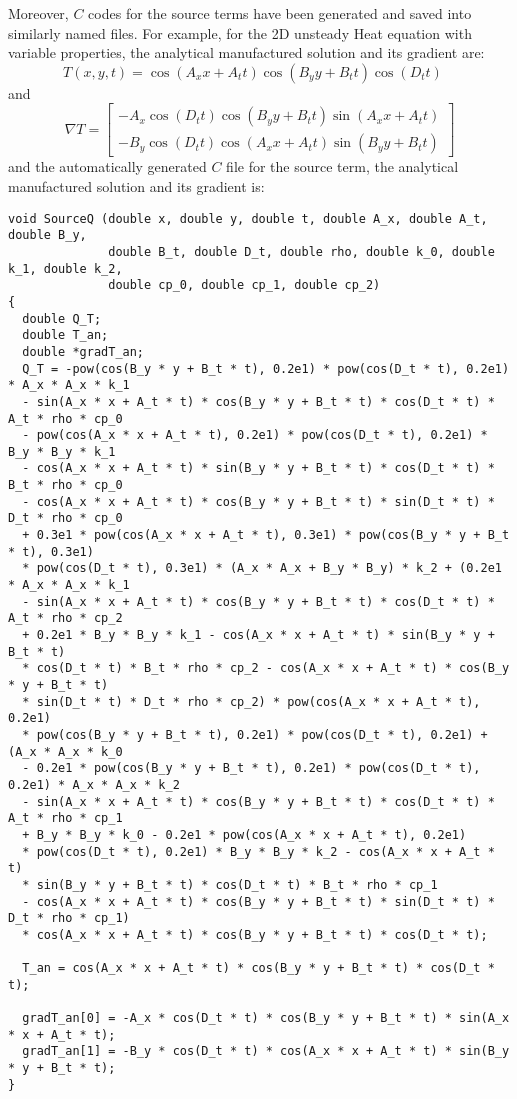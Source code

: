 \documentclass[a4paper,10pt]{article}
\begin{document}
Moreover, $C$ codes for the source terms have  been generated and saved into similarly named files. For example, for the 2D unsteady Heat equation with variable properties, the analytical manufactured solution and its gradient are:
\begin{equation}
 T(x,y,t) = \cos(A_x x+A_t t) \cos(B_y y+B_t t) \cos(D_t t)
\quad
\end{equation}
and
\begin{equation}
\nabla T = \left[
\begin{array}{c}
-A_x \cos(D_t t) \cos(B_y y+B_t t) \sin(A_x x+A_t t)\\
-B_y \cos(D_t t) \cos(A_x x+A_t t) \sin(B_y y+B_t t)
\end{array}\right]
\end{equation}
and the automatically generated $C$ file for the source term, the analytical manufactured solution and its gradient  is:
\begin{verbatim}
void SourceQ (double x, double y, double t, double A_x, double A_t, double B_y,
              double B_t, double D_t, double rho, double k_0, double k_1, double k_2,
              double cp_0, double cp_1, double cp_2)
{
  double Q_T;
  double T_an;
  double *gradT_an;
  Q_T = -pow(cos(B_y * y + B_t * t), 0.2e1) * pow(cos(D_t * t), 0.2e1) * A_x * A_x * k_1
  - sin(A_x * x + A_t * t) * cos(B_y * y + B_t * t) * cos(D_t * t) * A_t * rho * cp_0
  - pow(cos(A_x * x + A_t * t), 0.2e1) * pow(cos(D_t * t), 0.2e1) * B_y * B_y * k_1
  - cos(A_x * x + A_t * t) * sin(B_y * y + B_t * t) * cos(D_t * t) * B_t * rho * cp_0
  - cos(A_x * x + A_t * t) * cos(B_y * y + B_t * t) * sin(D_t * t) * D_t * rho * cp_0
  + 0.3e1 * pow(cos(A_x * x + A_t * t), 0.3e1) * pow(cos(B_y * y + B_t * t), 0.3e1)
  * pow(cos(D_t * t), 0.3e1) * (A_x * A_x + B_y * B_y) * k_2 + (0.2e1 * A_x * A_x * k_1
  - sin(A_x * x + A_t * t) * cos(B_y * y + B_t * t) * cos(D_t * t) * A_t * rho * cp_2
  + 0.2e1 * B_y * B_y * k_1 - cos(A_x * x + A_t * t) * sin(B_y * y + B_t * t)
  * cos(D_t * t) * B_t * rho * cp_2 - cos(A_x * x + A_t * t) * cos(B_y * y + B_t * t)
  * sin(D_t * t) * D_t * rho * cp_2) * pow(cos(A_x * x + A_t * t), 0.2e1)
  * pow(cos(B_y * y + B_t * t), 0.2e1) * pow(cos(D_t * t), 0.2e1) + (A_x * A_x * k_0
  - 0.2e1 * pow(cos(B_y * y + B_t * t), 0.2e1) * pow(cos(D_t * t), 0.2e1) * A_x * A_x * k_2
  - sin(A_x * x + A_t * t) * cos(B_y * y + B_t * t) * cos(D_t * t) * A_t * rho * cp_1
  + B_y * B_y * k_0 - 0.2e1 * pow(cos(A_x * x + A_t * t), 0.2e1)
  * pow(cos(D_t * t), 0.2e1) * B_y * B_y * k_2 - cos(A_x * x + A_t * t)
  * sin(B_y * y + B_t * t) * cos(D_t * t) * B_t * rho * cp_1
  - cos(A_x * x + A_t * t) * cos(B_y * y + B_t * t) * sin(D_t * t) * D_t * rho * cp_1)
  * cos(A_x * x + A_t * t) * cos(B_y * y + B_t * t) * cos(D_t * t);

  T_an = cos(A_x * x + A_t * t) * cos(B_y * y + B_t * t) * cos(D_t * t);

  gradT_an[0] = -A_x * cos(D_t * t) * cos(B_y * y + B_t * t) * sin(A_x * x + A_t * t);
  gradT_an[1] = -B_y * cos(D_t * t) * cos(A_x * x + A_t * t) * sin(B_y * y + B_t * t);
}
\end{verbatim}

 

\end{document}
